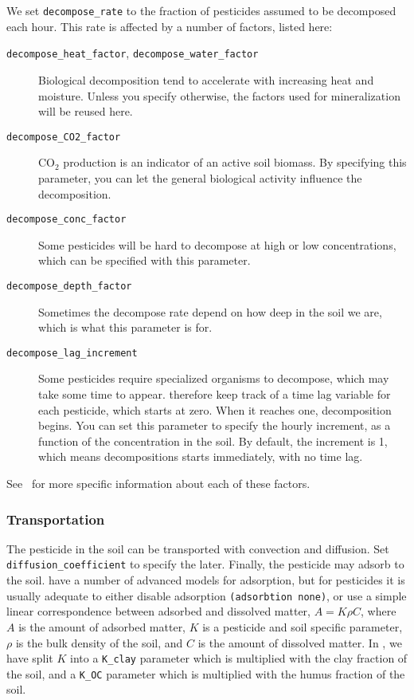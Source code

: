 \documentclass[a4paper,11pt]{article}
\begin{document}
We set \texttt{decompose\_rate} to the fraction of pesticides assumed
to be decomposed each hour.  This rate is affected by a number of
factors, listed here:
\begin{description}
\item[\texttt{decompose\_heat\_factor},
  \texttt{decompose\_water\_factor}] Biological decomposition tend to
  accelerate with increasing heat and moisture.  Unless you specify
  otherwise, the factors used for mineralization will be reused here.
\item[\texttt{decompose\_CO2\_factor}] CO$_2$ production is an
  indicator of an active soil biomass.  By specifying this parameter,
  you can let the general biological activity influence the
  decomposition. 
\item[\texttt{decompose\_conc\_factor}] Some pesticides will be hard
  to decompose at high or low concentrations, which can be specified
  with this parameter. 
\item[\texttt{decompose\_depth\_factor}] Sometimes the decompose rate
  depend on how deep in the soil we are, which is what this parameter
  is for. 
\item[\texttt{decompose\_lag\_increment}] Some pesticides require
  specialized organisms to decompose, which may take some time to
  appear.  \Daisy{} therefore keep track of a time lag variable for
  each pesticide, which starts at zero.  When it reaches one,
  decomposition begins.  You can set this parameter to specify the
  hourly increment, as a function of the concentration in the soil.
  By default, the increment is 1, which means decompositions starts
  immediately, with no time lag.
\end{description}
See~\cite{dina81} for more specific information about each of these
factors. 

\subsubsection{Transportation}

The pesticide in the soil can be transported with convection and
diffusion.  Set \texttt{diffusion\_coefficient} to specify the later.
Finally, the pesticide may adsorb to the soil.  \Daisy{} have a number
of advanced models for adsorption, but for pesticides it is usually
adequate to either disable adsorption \texttt{(adsorbtion none)}, or
use a simple linear correspondence between adsorbed and dissolved
matter, $A = K \rho C$, where $A$ is the amount of adsorbed matter,
$K$ is a pesticide and soil specific parameter, $\rho$ is the bulk
density of the soil, and $C$ is the amount of dissolved matter.  In
\daisy{}, we have split $K$ into a \texttt{K\_clay} parameter which is
multiplied with the clay fraction of the soil, and a \texttt{K\_OC}
parameter which is multiplied with the humus fraction of the soil.
\end{document}
